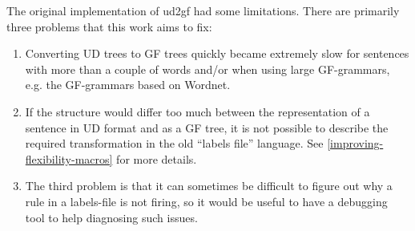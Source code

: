 
The original implementation of ud2gf had some limitations. There are primarily three problems that this work aims to fix:

\begin{enumerate}
    \item Converting UD trees to GF trees quickly became extremely slow for sentences with more than a couple of words and/or
    when using large GF-grammars, e.g. the GF-grammars based on Wordnet\cite{angelov2016predicting}.
\item
    If the structure would differ too much between the representation of a sentence in UD format and as a GF tree, it is not possible to describe the required transformation in the old ``labels file'' language. See \autoref{improving-flexibility-macros} for more details.
\item
    The third problem is that it can sometimes be difficult to figure out why a rule in a labels-file is not firing, so it would be useful to have a debugging tool to help diagnosing such issues.
\end{enumerate}


%
%
%







